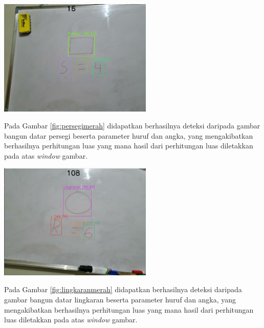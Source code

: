 \begin{center}
	\includegraphics[width=0.55\textwidth]{gambar/persegi merah.png}
	\label{fig:persegimerah}
\end{center}
Pada Gambar \ref{fig:persegimerah} didapatkan berhasilnya deteksi daripada gambar bangun datar persegi beserta parameter huruf dan angka, yang mengakibatkan berhasilnya perhitungan luas yang mana hasil dari perhitungan luas diletakkan pada atas \textit{window} gambar.

\begin{center}
	\includegraphics[width=0.55\textwidth]{gambar/lingkaran merah.png}
	\label{fig:lingkaranmerah}
\end{center}
Pada Gambar \ref{fig:lingkaranmerah} didapatkan berhasilnya deteksi daripada gambar bangun datar lingkaran beserta parameter huruf dan angka, yang mengakibatkan berhasilnya perhitungan luas yang mana hasil dari perhitungan luas diletakkan pada atas \textit{window} gambar.

